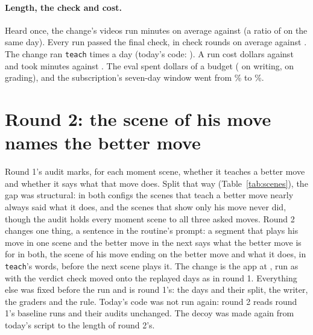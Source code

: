 \documentclass[11pt]{article}
\begin{document}
\paragraph{Length, the check and cost.} Heard once, the change's videos run \CandHeard{} minutes on
average against \BaseHeard{} (a ratio of \LengthRatio{} on the same day). Every run passed the final
check, in \CandRounds{} check rounds on average against \BaseRounds. The change ran \texttt{teach}
\CandTeach{} times a day (today's code: \BaseTeach). A run cost \CandCost{} dollars against \BaseCost{}
and took \CandMinutes{} minutes against \BaseMinutes. The eval spent \Spent{} dollars of a \Budget{}
budget (\WriterSpend{} on writing, \GraderSpend{} on grading), and the subscription's seven-day window
went from \SevenDayFirst\% to \SevenDayLast\%.

\begin{table}[h]
\centering
\scriptsize\setlength{\tabcolsep}{4pt}\DayTable
\caption{Each day: the judge's verdict on each criterion from the change's side ($+$ the change, $-$
today's code, 0 a tie), the change's length over today's, the verdict lines each spoke, and the share
of the asked moves each made.}
\label{tab:days}
\end{table}

\section{Round 2: the scene of his move names the better move}

Round 1's audit marks, for each moment scene, whether it teaches a better move and whether it says
what that move does. Split that way (Table~\ref{tab:scenes}), the gap was structural: in both
configs the scenes that teach a better move nearly always said what it does, and the scenes that
show only his move never did, though the audit holds every moment scene to all three asked moves.
Round 2 changes one thing, a sentence in the routine's prompt: a segment that plays his move in
one scene and the better move in the next says what the better move is for in both, the scene of
his move ending on the better move and what it does, in \texttt{teach}'s words, before the next
scene plays it. The change is the app at \texttt{\TwoChangeCommit}, run as \texttt{\TwoCommit}
with the verdict check moved onto the replayed days as in round 1. Everything else was fixed before
the run and is round 1's: the \Days{} days and their split, the writer, the graders and the rule.
Today's code was not run again: round 2 reads round 1's baseline runs and their audits unchanged.
The decoy was made again from today's script to the length of round 2's.
\end{document}
